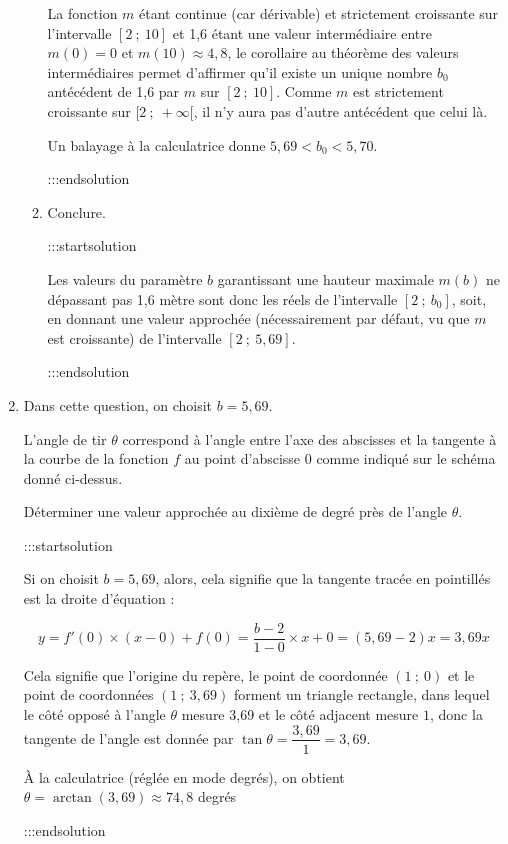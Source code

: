 \documentclass{cornouaille}
\begin{document}
\begin{enumerate}
\begin{enumerate}
La fonction $m$ étant continue (car dérivable) et strictement croissante sur l'intervalle $[2~;~10]$ et 1,6 étant une valeur intermédiaire entre $m(0) = 0$ et $m(10) \approx 4,8$, le corollaire au théorème des valeurs intermédiaires permet d'affirmer qu'il existe un unique nombre $b_0$ antécédent de 1,6 par $m$ sur $[2~;~10]$. Comme $m$ est strictement croissante sur $[2~;~+\infty[$, il n'y aura pas d'autre antécédent que celui là.

Un balayage à la calculatrice donne $5,69 < b_0 < 5,70$.


:::endsolution
\item Conclure.


:::startsolution


Les valeurs du paramètre $b$ garantissant une hauteur maximale $m(b)$ ne dépassant pas 1,6 mètre sont donc les réels de l'intervalle $[2~;~b_0]$, soit, en donnant une valeur approchée (nécessairement par défaut, vu que $m$ est croissante) de l'intervalle $[2~;~5,69]$.


:::endsolution
\end{enumerate}



\setcounter{enumii}{0}
\item  Dans cette question, on choisit $b = 5,69$.

L'angle de tir $\theta$ correspond à l'angle entre l'axe des abscisses et la tangente à la courbe de la
fonction $f$ au point d'abscisse $0$ comme indiqué sur le schéma donné ci-dessus.

Déterminer une valeur approchée au dixième de degré près de l'angle $\theta$.


:::startsolution

Si on choisit $b = 5,69$, alors, cela signifie que la tangente tracée en pointillés est la droite d'équation :

$$
y = f'(0) \times (x - 0) + f(0) = \dfrac{b - 2}{1 - 0} \times x + 0 = (5,69 - 2)x = 3,69x
$$

Cela signifie que l'origine du repère, le point de coordonnée $(1~;~0)$ et le point de coordonnées $(1~;~3,69)$ forment un triangle rectangle, dans lequel le côté opposé à l'angle $\theta$ mesure 3,69 et le côté adjacent mesure $1$, donc la tangente de l'angle est donnée par $\tan \theta = \dfrac{3,69}{1} = 3,69$.

À la calculatrice (réglée en mode degrés), on obtient $\theta = \arctan(3,69) \approx 74,8$ degrés


:::endsolution
\end{enumerate}
\end{document}

